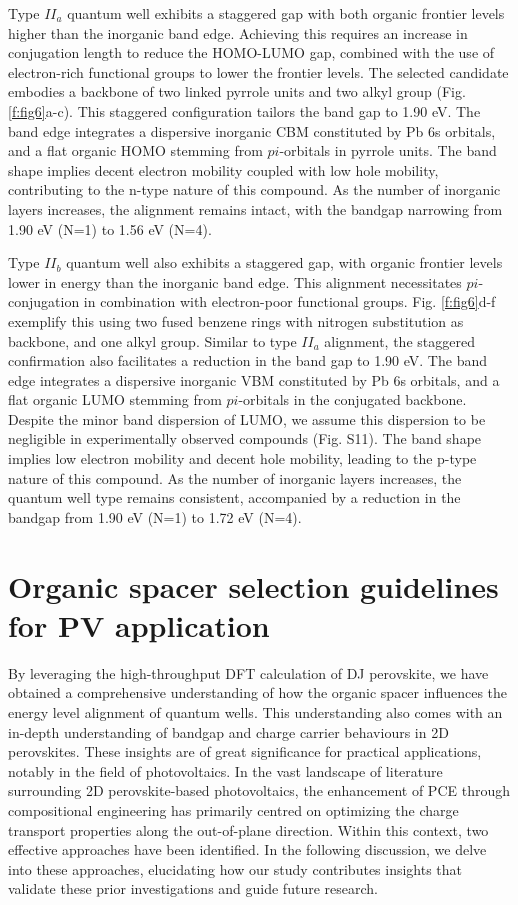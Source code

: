 Type $II_a$ quantum well exhibits a staggered gap with both organic frontier levels higher than the inorganic band edge. Achieving this requires an increase in conjugation length to reduce the HOMO-LUMO gap, combined with the use of electron-rich functional groups to lower the frontier levels. The selected candidate embodies a backbone of two linked pyrrole units and two alkyl group (Fig. \ref{f:fig6}a-c). This staggered configuration tailors the band gap to 1.90 eV. The band edge integrates a dispersive inorganic CBM constituted by Pb 6s orbitals, and a flat organic HOMO stemming from $pi$-orbitals in pyrrole units. The band shape implies decent electron mobility coupled with low hole mobility, contributing to the n-type nature of this compound. As the number of inorganic layers increases, the alignment remains intact, with the bandgap narrowing from 1.90 eV (N=1) to 1.56 eV (N=4).

Type $II_b$ quantum well also exhibits a staggered gap, with organic frontier levels lower in energy than the inorganic band edge. This alignment necessitates $pi$-conjugation in combination with electron-poor functional groups. Fig. \ref{f:fig6}d-f exemplify this using two fused benzene rings with nitrogen substitution as backbone, and one alkyl group. Similar to type $II_a$  alignment, the staggered confirmation also facilitates a reduction in the band gap to 1.90 eV. The band edge integrates a dispersive inorganic VBM constituted by Pb 6s orbitals, and a flat organic LUMO stemming from $pi$-orbitals in the conjugated backbone. Despite the minor band dispersion of LUMO, we assume this dispersion to be negligible in experimentally observed compounds (Fig. S11). The band shape implies low electron mobility and decent hole mobility, leading to the p-type nature of this compound. As the number of inorganic layers increases, the quantum well type remains consistent, accompanied by a reduction in the bandgap from 1.90 eV (N=1) to 1.72 eV (N=4).

\section{Organic spacer selection guidelines for PV application}

By leveraging the high-throughput DFT calculation of DJ perovskite, we have obtained a comprehensive understanding of how the organic spacer influences the energy level alignment of quantum wells. This understanding also comes with an in-depth understanding of bandgap and charge carrier behaviours in 2D perovskites. These insights are of great significance for practical applications, notably in the field of photovoltaics. In the vast landscape of literature surrounding 2D perovskite-based photovoltaics, the enhancement of PCE through compositional engineering has primarily centred on optimizing the charge transport properties along the out-of-plane direction. Within this context, two effective approaches have been identified. In the following discussion, we delve into these approaches, elucidating how our study contributes insights that validate these prior investigations and guide future research. 

